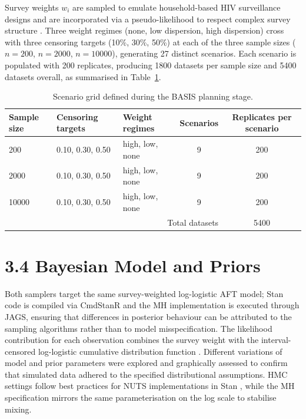 Survey weights $w_i$ are sampled to emulate household-based HIV surveillance designs and are incorporated via a pseudo-likelihood to respect complex survey structure \citep{Si2020Bayesian}. Three weight regimes (none, low dispersion, high dispersion) cross with three censoring targets (10\%, 30\%, 50\%) at each of the three sample sizes ($n=200$, $n=2000$, $n=10000$), generating 27 distinct scenarios. Each scenario is populated with 200 replicates, producing 1800 datasets per sample size and 5400 datasets overall, as summarised in Table~\ref{tab:scenario-grid}.

\begin{table}[htbp]
\centering
\caption{Scenario grid defined during the BASIS planning stage.}
\label{tab:scenario-grid}
\begin{tabular}{l l l c c}
\toprule
Sample size & Censoring targets & Weight regimes & Scenarios & Replicates per scenario \\
\midrule
200 & 0.10, 0.30, 0.50 & high, low, none & 9 & 200 \\
2000 & 0.10, 0.30, 0.50 & high, low, none & 9 & 200 \\
10000 & 0.10, 0.30, 0.50 & high, low, none & 9 & 200 \\
\midrule
\multicolumn{4}{r}{Total datasets} & 5400 \\
\bottomrule
\end{tabular}
\end{table}

\section{3.4 Bayesian Model and Priors}
\label{sec:model-priors}
Both samplers target the same survey-weighted log-logistic AFT model; Stan code is compiled via CmdStanR and the MH implementation is executed through JAGS, ensuring that differences in posterior behaviour can be attributed to the sampling algorithms rather than to model misspecification. The likelihood contribution for each observation combines the survey weight with the interval-censored log-logistic cumulative distribution function \citep{AndersonBergman2024}. Different variations of model and prior parameters were explored and graphically assessed to confirm that simulated data adhered to the specified distributional assumptions. HMC settings follow best practices for NUTS implementations in Stan \citep{ThomasTu2021HMC}, while the MH specification mirrors the same parameterisation on the log scale to stabilise mixing.


